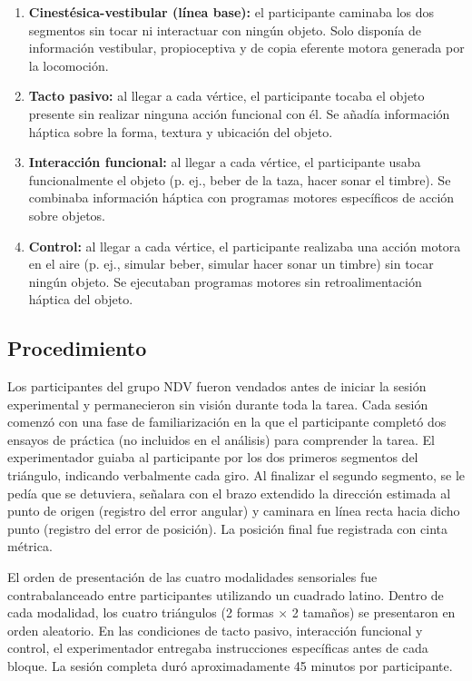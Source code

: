 \documentclass[12pt,letterpaper]{article}
\begin{document}
\begin{enumerate}
    \item \textbf{Cinestésica-vestibular (línea base):} el participante caminaba los dos segmentos sin tocar ni interactuar con ningún objeto. Solo disponía de información vestibular, propioceptiva y de copia eferente motora generada por la locomoción.
    \item \textbf{Tacto pasivo:} al llegar a cada vértice, el participante tocaba el objeto presente sin realizar ninguna acción funcional con él. Se añadía información háptica sobre la forma, textura y ubicación del objeto.
    \item \textbf{Interacción funcional:} al llegar a cada vértice, el participante usaba funcionalmente el objeto (p. ej., beber de la taza, hacer sonar el timbre). Se combinaba información háptica con programas motores específicos de acción sobre objetos.
    \item \textbf{Control:} al llegar a cada vértice, el participante realizaba una acción motora en el aire (p. ej., simular beber, simular hacer sonar un timbre) sin tocar ningún objeto. Se ejecutaban programas motores sin retroalimentación háptica del objeto.
\end{enumerate}

\subsection{Procedimiento}

Los participantes del grupo NDV fueron vendados antes de iniciar la sesión experimental y permanecieron sin visión durante toda la tarea. Cada sesión comenzó con una fase de familiarización en la que el participante completó dos ensayos de práctica (no incluidos en el análisis) para comprender la tarea. El experimentador guiaba al participante por los dos primeros segmentos del triángulo, indicando verbalmente cada giro. Al finalizar el segundo segmento, se le pedía que se detuviera, señalara con el brazo extendido la dirección estimada al punto de origen (registro del error angular) y caminara en línea recta hacia dicho punto (registro del error de posición). La posición final fue registrada con cinta métrica.

El orden de presentación de las cuatro modalidades sensoriales fue contrabalanceado entre participantes utilizando un cuadrado latino. Dentro de cada modalidad, los cuatro triángulos (2 formas $\times$ 2 tamaños) se presentaron en orden aleatorio. En las condiciones de tacto pasivo, interacción funcional y control, el experimentador entregaba instrucciones específicas antes de cada bloque. La sesión completa duró aproximadamente 45 minutos por participante.
\end{document}
